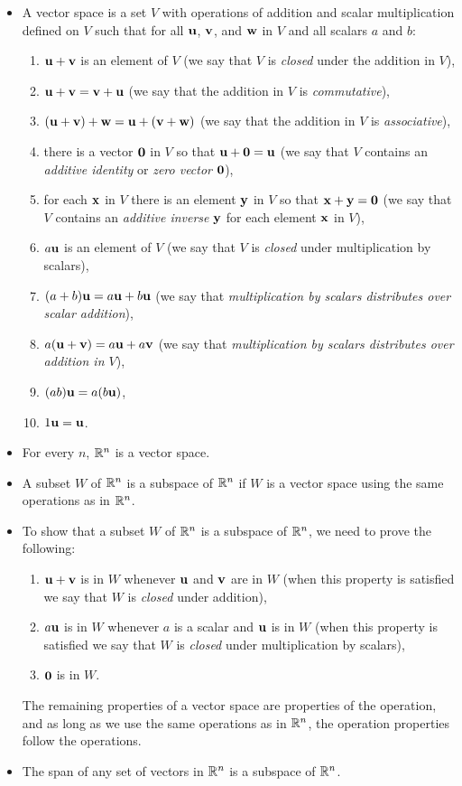 \begin{itemize}
\item A vector space is a set $V$ with operations of addition and scalar multiplication defined on $V$ such that for all $\mathbf{u}$, $\mathbf{v}$, and $\mathbf{w}$ in $V$ and all scalars $a$ and $b$:
\begin{enumerate}
\item $\mathbf{u} + \mathbf{v}$ is an element of $V$ (we say that $V$ is \emph{closed} under the addition in $V$),
\item $\mathbf{u} + \mathbf{v} = \mathbf{v} + \mathbf{u}$ (we say that the addition in $V$ is \emph{commutative}),
\item $(\mathbf{u} + \mathbf{v}) + \mathbf{w} = \mathbf{u} + (\mathbf{v} + \mathbf{w})$ (we say that the addition in $V$ is \emph{associative}),
\item there is a vector $\mathbf{0}$ in $V$ so that $\mathbf{u} + \mathbf{0} = \mathbf{u}$ (we say that $V$ contains an \emph{additive identity} or \emph{zero vector} $\mathbf{0}$),
\item for each $\mathbf{x}$ in $V$ there is an element $\mathbf{y}$ in $V$ so that $\mathbf{x} + \mathbf{y} = \mathbf{0}$ (we say that $V$ contains an \emph{additive inverse} $\mathbf{y}$ for each element $\mathbf{x}$ in $V$),
\item $a \mathbf{u}$ is an element of $V$ (we say that $V$ is \emph{closed} under multiplication by scalars),
\item $(a+b) \mathbf{u} = a\mathbf{u} + b\mathbf{u}$ (we say that \emph{multiplication by scalars distributes over scalar addition}),
\item $a(\mathbf{u} + \mathbf{v}) = a\mathbf{u} + a\mathbf{v}$ (we say that \emph{multiplication by scalars distributes over addition in $V$}),
\item $(ab) \mathbf{u} = a(b\mathbf{u})$,
\item $1 \mathbf{u} = \mathbf{u}$. 
\end{enumerate}
\item For every $n$, $\mathbb{R}^n$ is a vector space.
\item A subset $W$ of $\mathbb{R}^n$ is a subspace of $\mathbb{R}^n$ if $W$ is a vector space using the same operations as in $\mathbb{R}^n$. 
\item To show that a subset $W$ of $\mathbb{R}^n$ is a subspace of $\mathbb{R}^n$, we need to prove the following:
\begin{enumerate}
\item $\mathbf{u} + \mathbf{v}$ is in $W$ whenever $\mathbf{u}$ and $\mathbf{v}$ are in $W$ (when this property is satisfied we say that $W$ is \emph{closed} under addition),
\item $a \mathbf{u}$ is in $W$ whenever $a$ is a scalar and $\mathbf{u}$ is in $W$ (when this property is satisfied we say that $W$ is \emph{closed} under multiplication by scalars),
\item $\mathbf{0}$ is in $W$.
\end{enumerate}
The remaining properties of a vector space are properties of the operation, and as long as we use the same operations as in $\mathbb{R}^n$, the operation properties follow the operations. 
\item The span of any set of vectors in $\mathbb{R}^n$ is a subspace of $\mathbb{R}^n$. 
\end{itemize}
